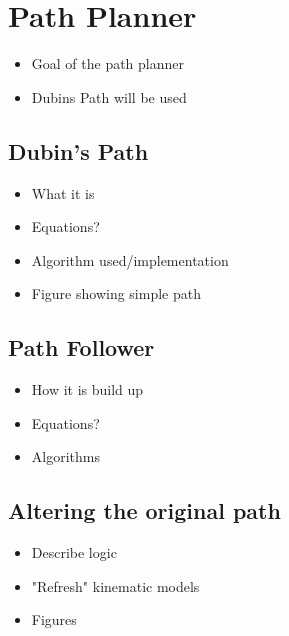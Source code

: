 \section{Path Planner}

\begin{itemize}
	\item Goal of the path planner
	\item Dubins Path will be used
\end{itemize}


\subsection{Dubin's Path}

\begin{itemize}
	\item What it is
	\item Equations?
	\item Algorithm used/implementation
	\item Figure showing simple path
\end{itemize}


\subsection{Path Follower}

\begin{itemize}
	\item How it is build up
	\item Equations?
	\item Algorithms
\end{itemize}


\subsection{Altering the original path}

\begin{itemize}
	\item Describe logic
	\item "Refresh" kinematic models
	\item Figures
\end{itemize}